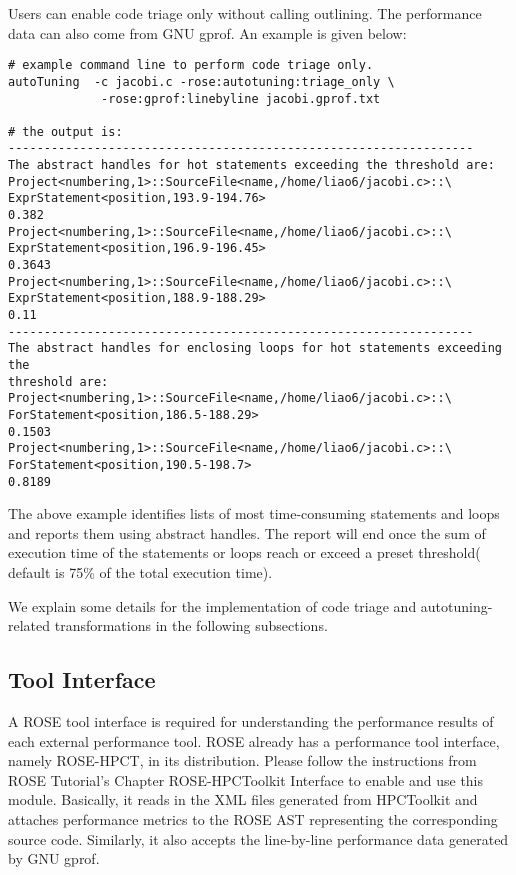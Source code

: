 Users can enable code triage only without calling outlining. 
The performance data can also come from GNU gprof. 
An example is given below:
\begin{verbatim}
# example command line to perform code triage only.
autoTuning  -c jacobi.c -rose:autotuning:triage_only \
             -rose:gprof:linebyline jacobi.gprof.txt 

# the output is:
-----------------------------------------------------------------
The abstract handles for hot statements exceeding the threshold are:
Project<numbering,1>::SourceFile<name,/home/liao6/jacobi.c>::\
ExprStatement<position,193.9-194.76>
0.382
Project<numbering,1>::SourceFile<name,/home/liao6/jacobi.c>::\
ExprStatement<position,196.9-196.45>
0.3643
Project<numbering,1>::SourceFile<name,/home/liao6/jacobi.c>::\
ExprStatement<position,188.9-188.29>
0.11
-----------------------------------------------------------------
The abstract handles for enclosing loops for hot statements exceeding the
threshold are:
Project<numbering,1>::SourceFile<name,/home/liao6/jacobi.c>::\
ForStatement<position,186.5-188.29>
0.1503
Project<numbering,1>::SourceFile<name,/home/liao6/jacobi.c>::\
ForStatement<position,190.5-198.7>
0.8189
\end{verbatim}

The above example identifies lists of most time-consuming statements and loops and reports them using abstract handles. 
The report will end once the sum of execution time of the statements or
loops reach or exceed a preset threshold( default is 75\% of the total execution time). 

We explain some details for the implementation of code triage and
autotuning-related transformations in the following subsections.
\subsection{Tool Interface}
A ROSE tool interface is required for understanding the performance results of each
external performance tool. 
ROSE already has a performance tool interface, namely ROSE-HPCT,
in its distribution.  Please follow the instructions from ROSE
Tutorial's Chapter ROSE-HPCToolkit Interface to enable and use this module. 
Basically, it
reads in the XML files generated from HPCToolkit and attaches performance metrics to
the ROSE AST representing the corresponding source code. 
Similarly, it also accepts the line-by-line performance data generated by GNU
gprof.

